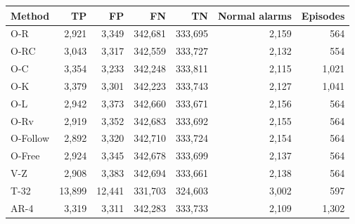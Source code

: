 \begin{tabular}{lrrrrrr}
\toprule
Method & TP & FP & FN & TN & Normal alarms & Episodes \\
\midrule
O-R & 2,921 & 3,349 & 342,681 & 333,695 & 2,159 & 564 \\
O-RC & 3,043 & 3,317 & 342,559 & 333,727 & 2,132 & 554 \\
O-C & 3,354 & 3,233 & 342,248 & 333,811 & 2,115 & 1,021 \\
O-K & 3,379 & 3,301 & 342,223 & 333,743 & 2,127 & 1,041 \\
O-L & 2,942 & 3,373 & 342,660 & 333,671 & 2,156 & 564 \\
O-Rv & 2,919 & 3,352 & 342,683 & 333,692 & 2,155 & 564 \\
O-Follow & 2,892 & 3,320 & 342,710 & 333,724 & 2,154 & 564 \\
O-Free & 2,924 & 3,345 & 342,678 & 333,699 & 2,137 & 564 \\
V-Z & 2,908 & 3,383 & 342,694 & 333,661 & 2,138 & 564 \\
T-32 & 13,899 & 12,441 & 331,703 & 324,603 & 3,002 & 597 \\
AR-4 & 3,319 & 3,311 & 342,283 & 333,733 & 2,109 & 1,302 \\
\bottomrule
\end{tabular}
